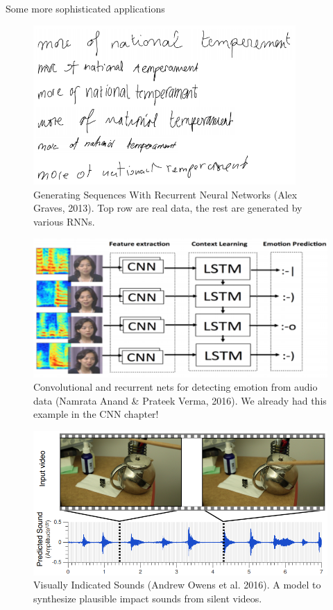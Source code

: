 \begin{vbframe}{Some more sophisticated applications}
  \begin{figure}
    \centering
    \includegraphics[width=10cm]{plots/hand_writing_generation.png}
    \caption{Generating Sequences With Recurrent Neural Networks (Alex Graves, 2013). Top row are real data, the rest are generated by various RNNs.}
  \end{figure}
\framebreak
  \begin{figure}
    \centering
    \includegraphics[width=11.5cm]{plots/emotion_from_audio_data.png}
    \caption{Convolutional and recurrent nets for detecting emotion from audio data (Namrata Anand \& Prateek Verma, 2016). We already had this example in the CNN chapter!}
  \end{figure}  
\framebreak
  \begin{figure}
    \centering
    \includegraphics[width=11.5cm]{plots/visually_indicated_sounds.png}
    \caption{Visually Indicated Sounds (Andrew Owens et al. 2016). A model to synthesize plausible impact sounds from silent videos.\href{https://www.youtube.com/watch?v=0FW99AQmMc8&feature=youtu.be&t=61}{}}
  \end{figure}   
\end{vbframe}
